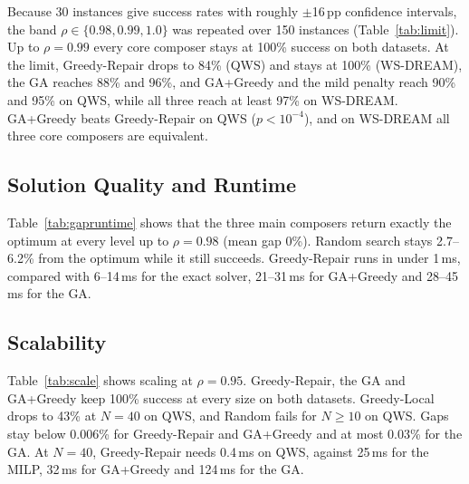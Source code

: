\documentclass[conference]{IEEEtran}
\begin{document}
Because 30 instances give success rates with roughly $\pm$16\,pp confidence intervals, the band $\rho\in\{0.98,0.99,1.0\}$ was repeated over 150 instances (Table~\ref{tab:limit}). Up to $\rho=0.99$ every core composer stays at 100\% success on both datasets. At the limit, Greedy-Repair drops to 84\% (QWS) and stays at 100\% (WS-DREAM), the GA reaches 88\% and 96\%, and GA+Greedy and the mild penalty reach 90\% and 95\% on QWS, while all three reach at least 97\% on WS-DREAM. GA+Greedy beats Greedy-Repair on QWS ($p<10^{-4}$), and on WS-DREAM all three core composers are equivalent.

\begin{table}[t]
\centering
\caption{Success Rate Near the Limit over 150 Instances (E8). GL = Greedy-Local, GR = Greedy-Repair, G+G = GA+Greedy, $\lambda=1$ = GA with a Static Penalty $\lambda=1$}\label{tab:limit}
\resizebox{\columnwidth}{!}{}
\end{table}

\subsection{Solution Quality and Runtime}
Table~\ref{tab:gapruntime} shows that the three main composers return exactly the optimum at every level up to $\rho=0.98$ (mean gap 0\%). Random search stays 2.7--6.2\% from the optimum while it still succeeds. Greedy-Repair runs in under 1\,ms, compared with 6--14\,ms for the exact solver, 21--31\,ms for GA+Greedy and 28--45\,ms for the GA.

\begin{table}[t]
\centering
\caption{Mean Optimality Gap (\%) and Runtime Range, $N=10$, $M=20$. ``--'' Means Fewer than 5 Successes}\label{tab:gapruntime}
\resizebox{\columnwidth}{!}{}
\end{table}

\subsection{Scalability}
Table~\ref{tab:scale} shows scaling at $\rho=0.95$. Greedy-Repair, the GA and GA+Greedy keep 100\% success at every size on both datasets. Greedy-Local drops to 43\% at $N=40$ on QWS, and Random fails for $N\ge10$ on QWS. Gaps stay below 0.006\% for Greedy-Repair and GA+Greedy and at most 0.03\% for the GA. At $N=40$, Greedy-Repair needs 0.4\,ms on QWS, against 25\,ms for the MILP, 32\,ms for GA+Greedy and 124\,ms for the GA.
\end{document}
